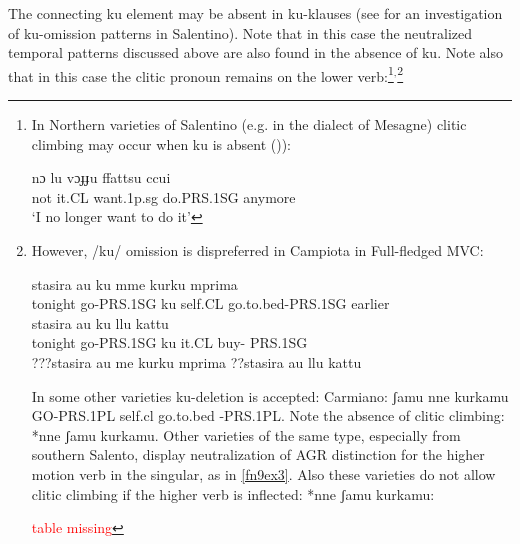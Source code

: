 \documentclass[output=paper]{langscibook}
\begin{document}
The connecting ku element may be absent in ku-klauses (see \cite{ledgeway2015a} for an investigation of ku-omission patterns in Salentino).  Note that in this case the neutralized temporal patterns discussed above are also found in the absence of ku. Note also that in this case the clitic pronoun remains on the lower verb:\footnote{In Northern varieties of Salentino (e.g. in the dialect of Mesagne) clitic climbing may occur when ku is absent (\cite{calabrese1993a, terzi1992a, terzi1994a, terzi1996a})):

\ea \label{fn8ex}\gll nɔ  lu  vɔɟɟu  ffattsu   ccui    \\ 
 not it.CL  want.1p.sg  do.PRS.1SG  anymore\\
 \glt `I no longer want to do it’
\z 

}$^,$\footnote{However, /ku/ omission is dispreferred in Campiota in Full-fledged MVC:

\ea \label{fn9ex}
    \ea \label{fn9exa} \gll stasira au      ku  mme    kurku       mprima\\
     tonight go-PRS.1SG  ku self.CL  go.to.bed-PRS.1SG  earlier\\
    \ex \label{fn9exb}\gll stasira  au       ku  llu   kattu\\
   tonight  go-PRS.1SG  ku  it.CL buy- PRS.1SG \\
    \z
\ex \label{fn9ex2}
    \ea \label{fn9ex2a}???stasira au me kurku mprima
    \ex \label{fn9ex2b}??stasira au llu kattu 
    \z
\z
  
In some other varieties ku-deletion is accepted:  Carmiano: ʃamu nne kurkamu GO-PRS.1PL self.cl   go.to.bed -PRS.1PL. Note the absence of clitic climbing:  *nne ʃamu kurkamu.  Other varieties of the same type, especially from southern Salento, display neutralization of AGR distinction for the higher motion verb in the singular, as in \ref{fn9ex3}.  Also these varieties do not allow clitic climbing if the higher verb is inflected: *nne ʃamu kurkamu:  

\textcolor{red}{table missing}}

\begin{comment}

\ea \label{fn9ex3}
\begin{table}[htb] \small
\begin{tabular}{llll}
bba        & mme     & korku             & ( Tricase) \\
GO-PRS.1SG & self.cl & go.to.bed-PRS.1SG &            \\
bba        & tte     & korki             & 2SG        \\
bba        & sse     & korka             & 3SG        \\
ʃamu       & nne     & korkamu           & 1PL        \\
ʃati       & bbe     & korkati           & 2PL        \\
ane        & sse     & korkane           & 3PL       
\end{tabular}
\end{table}
\z

\end{comment}
\end{document}
